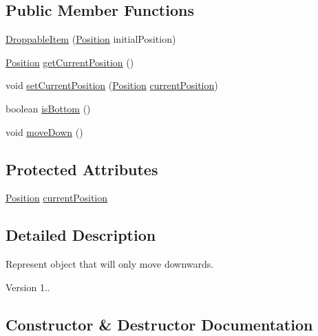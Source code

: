\subsection*{Public Member Functions}
\begin{DoxyCompactItemize}
\item 
\mbox{\hyperlink{class_droppable_item_a107fe5746196496e9a5983cc95d9ef57}{Droppable\+Item}} (\mbox{\hyperlink{class_position}{Position}} initial\+Position)
\item 
\mbox{\hyperlink{class_position}{Position}} \mbox{\hyperlink{class_droppable_item_a90d927cd4460d9cd5e0070b000606cd3}{get\+Current\+Position}} ()
\item 
void \mbox{\hyperlink{class_droppable_item_a8064bb69947880b73bf164ed8c73eaef}{set\+Current\+Position}} (\mbox{\hyperlink{class_position}{Position}} \mbox{\hyperlink{class_droppable_item_a9215c9fa588c9bd5aae4da387121b75c}{current\+Position}})
\item 
boolean \mbox{\hyperlink{class_droppable_item_a5cbe880513fffe6c70678bd3b86ca934}{is\+Bottom}} ()
\item 
void \mbox{\hyperlink{class_droppable_item_ac1870d36f1861a4574414355983d56c5}{move\+Down}} ()
\end{DoxyCompactItemize}
\subsection*{Protected Attributes}
\begin{DoxyCompactItemize}
\item 
\mbox{\hyperlink{class_position}{Position}} \mbox{\hyperlink{class_droppable_item_a9215c9fa588c9bd5aae4da387121b75c}{current\+Position}}
\end{DoxyCompactItemize}


\subsection{Detailed Description}
Represent object that will only move downwards. \begin{DoxyVersion}{Version}
1.. 
\end{DoxyVersion}


\subsection{Constructor \& Destructor Documentation}
\mbox{\label{class_droppable_item_a107fe5746196496e9a5983cc95d9ef57}} 
